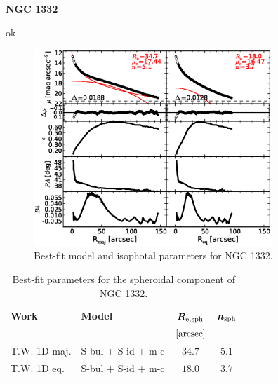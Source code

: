 \documentclass[preprint2]{emulateapj}
\newcommand{\fitfigurewidth}{0.8\textwidth}
\begin{document}
  \clearpage\newpage\noindent
  {\bf NGC 1332 \\}

  ok

  \begin{figure}[h]
  \begin{center}
  \includegraphics[width=\fitfigurewidth]{images/n1332_1Dfit.eps}
  \caption{Best-fit model and isophotal parameters for NGC 1332.}
  \end{center}
  \end{figure}

  \begin{table}[h]
  \small
  \caption{Best-fit parameters for the spheroidal component of NGC 1332.}
  \begin{center}
  \begin{tabular}{llcc}
  \hline
  {\bf Work} & {\bf Model}   & $\bm R_{\rm e,sph}$    & $\bm n_{\rm sph}$ \\
    &  &  $[\rm arcsec]$ & \\
  \hline
  T.W. 1D maj. & S-bul + S-id + m-c & $34.7$  &  $5.1$ \\
  T.W. 1D eq.  & S-bul + S-id + m-c & $18.0$  &  $3.7$ \\
  \hline
  \end{tabular}
  \end{center}
  \label{tab:n1332}
  \end{table}
\end{document}
